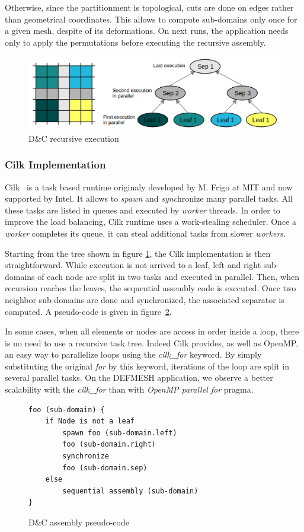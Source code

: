 \documentclass{IOS-Book-Article}
\begin{document}
Otherwise, since the partitionment is topological, cuts are done on edges rather than geometrical coordinates.
This allows to compute sub-domains only once for a given mesh, despite of its deformations.
On next runs, the application needs only to apply the permutations before executing the recursive assembly.
\begin{figure}[htp]
 \centering
 \includegraphics[scale=0.25]{DC_recursion.png}
 \caption{D\&C recursive execution}
 \label{fig:DCrec}
\end{figure}

\subsubsection{Cilk Implementation}
Cilk~\cite{cilk5} is a task based runtime originaly developed by M. Frigo at MIT and now supported by Intel.
It allows to \emph{spawn} and \emph{sync}hronize many parallel tasks.
All these tasks are listed in queues and executed by \emph{worker} threads.
In order to improve the load balancing, Cilk runtime uses a work-stealing scheduler. Once a \emph{worker} completes its queue, it can steal additional tasks from
slower \emph{workers}.

Starting from the tree shown in figure \ref{fig:DCrec}, the Cilk implementation is then straightforward.
While execution is not arrived to a leaf, left and right sub-domains of each node are split in two tasks and executed in parallel.
Then, when recursion reaches the leaves, the sequential assembly code is executed.
Once two neighbor sub-domains are done and synchronized, the associated separator is computed.
A pseudo-code is given in figure~\ref{fig:DCcode}.

In some cases, when all elements or nodes are access in order inside a loop, there is no need to use a recursive task tree.
Indeed Cilk provides, as well as OpenMP, an easy way to parallelize loops using the \emph{cilk\_for} keyword.
By simply substituting the original \emph{for} by this keyword, iterations of the loop are split in several parallel tasks.
On the DEFMESH application, we observe a better scalability with the \emph{cilk\_for} than with \emph{OpenMP parallel for} pragma.
\begin{figure}[htp]
 \begin{verbatim}
foo (sub-domain) {
    if Node is not a leaf
        spawn foo (sub-domain.left)
        foo (sub-domain.right)
        synchronize
        foo (sub-domain.sep)
    else
        sequential assembly (sub-domain)
}
 \end{verbatim}
 \caption{D\&C assembly pseudo-code}
 \label{fig:DCcode}
\end{figure}
\end{document}
